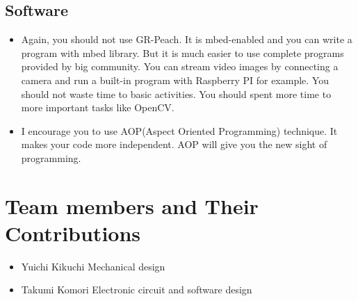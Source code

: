 \documentclass[journal]{IEEEtran}
\begin{document}
\subsection{Software}
\begin{itemize}
    \item Again, you should not use GR-Peach.
    It is mbed-enabled and you can write a program with mbed library.
    But it is much easier to use complete programs provided by big community.
    You can stream video images by connecting a camera and run a built-in program with Raspberry PI for example.
    You should not waste time to basic activities.
    You should spent more time to more important tasks like OpenCV.
    \item I encourage you to use AOP(Aspect Oriented Programming) technique.
    It makes your code more independent.
    AOP will give you the new sight of programming.
\end{itemize}

\appendices

\section{Team members and Their Contributions}
\begin{itemize}
    \item Yuichi Kikuchi \hfill Mechanical design
    \item Takumi Komori \hfill Electronic circuit and software design
\end{itemize}
\end{document}
